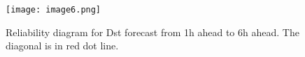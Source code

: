 





\begin{figure}
	\texttt{[image: image6.png]}
	\caption{Reliability diagram for Dst forecast from 1h ahead to 6h ahead. The diagonal is in red dot line.}
	\label{fig:gpnnreliability}
\end{figure}


